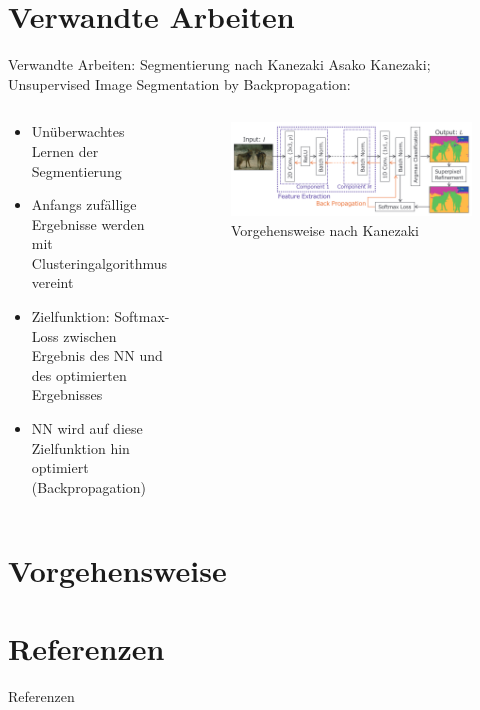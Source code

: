 \documentclass[aspectratio=169]{beamer}
\begin{document}
\section{Verwandte Arbeiten}

\begin{frame}{Verwandte Arbeiten: Segmentierung nach Kanezaki\cite{kanezaki2018_unsupervised_segmentation}}
Asako Kanezaki; Unsupervised Image Segmentation by Backpropagation\cite{kanezaki2018_unsupervised_segmentation}:
\begin{columns}
	\begin{column}{.5\textwidth}
		\begin{itemize}
			\item Unüberwachtes Lernen der Segmentierung
			\item Anfangs zufällige Ergebnisse werden mit Clusteringalgorithmus vereint
			\item Zielfunktion: Softmax-Loss zwischen Ergebnis des NN und des optimierten Ergebnisses
			\item NN wird auf diese Zielfunktion hin optimiert (Backpropagation)
		\end{itemize}
	\end{column}
	\begin{column}{.5\textwidth}
		\begin{figure}
			\includegraphics[width=\textwidth,keepaspectratio]{kanezaki.png}
			\caption{Vorgehensweise nach Kanezaki\cite{kanezaki2018_unsupervised_segmentation}}
		\end{figure}
	\end{column}
\end{columns}
\end{frame}

\section{Vorgehensweise}

\section{Referenzen}

\begin{frame}[shrink=30]{Referenzen}
	
	
\end{frame}

	
\end{document}
